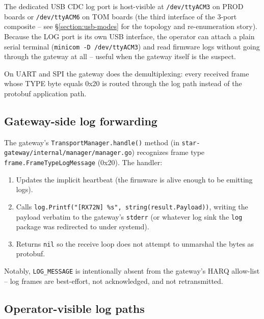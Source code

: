 The dedicated USB CDC log port is host-visible at
\texttt{/dev/ttyACM3} on PROD boards or \texttt{/dev/ttyACM6} on TOM
boards (the third interface of the 3-port composite -- see
\S\ref{section:usb-modes} for the topology and re-enumeration story).
Because the LOG port is its own USB interface, the operator can attach
a plain serial terminal (\texttt{minicom -D /dev/ttyACM3}) and read
firmware logs without going through the gateway at all -- useful when
the gateway itself is the suspect.

On UART and SPI the gateway does the demultiplexing: every received
frame whose TYPE byte equals 0x20 is routed through the log path
instead of the protobuf application path.

\subsection{Gateway-side log forwarding}

The gateway's \texttt{TransportManager.handle()} method (in
\texttt{star-gateway/internal/manager/manager.go}) recognizes frame
type \texttt{frame.FrameTypeLogMessage} (0x20). The handler:

\begin{enumerate}
  \item Updates the implicit heartbeat (the firmware is alive enough
        to be emitting logs).
  \item Calls \texttt{log.Printf("[RX72N] \%s",
        string(result.Payload))}, writing the payload verbatim to the
        gateway's \texttt{stderr} (or whatever log sink the
        \texttt{log} package was redirected to under systemd).
  \item Returns \texttt{nil} so the receive loop does not attempt to
        unmarshal the bytes as protobuf.
\end{enumerate}

Notably, \texttt{LOG\_MESSAGE} is intentionally absent from the
gateway's HARQ allow-list -- log frames are best-effort, not
acknowledged, and not retransmitted.

\subsection{Operator-visible log paths}

